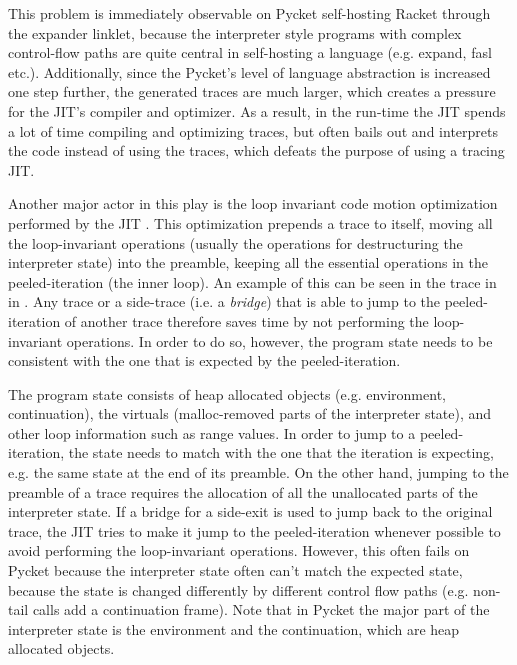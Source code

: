 This problem is immediately observable on Pycket self-hosting Racket
through the expander linklet, because the interpreter style programs
with complex control-flow paths are quite central in self-hosting a
language (e.g. expand, fasl etc.). Additionally, since the Pycket's
level of language abstraction is increased one step further, the
generated traces are much larger, which creates a pressure for the
JIT's compiler and optimizer. As a result, in the run-time the JIT
spends a lot of time compiling and optimizing traces, but often bails
out and interprets the code instead of using the traces, which defeats
the purpose of using a tracing JIT.


Another major actor in this play is the loop invariant code motion
optimization performed by the JIT \cite{loop-aware:12}. This
optimization prepends a trace to itself, moving all the loop-invariant
operations (usually the operations for destructuring the interpreter
state) into the preamble, keeping all the essential operations in the
peeled-iteration (the inner loop). An example of this can be seen in
the trace in  in . Any trace
or a side-trace (i.e. a \emph{bridge}) that is able to jump to the
peeled-iteration of another trace therefore saves time by not
performing the loop-invariant operations. In order to do so, however,
the program state needs to be consistent with the one that is expected
by the peeled-iteration.

The program state consists of heap allocated objects
(e.g. environment, continuation), the virtuals (malloc-removed parts
of the interpreter state), and other loop information such as range
values. In order to jump to a peeled-iteration, the state needs to
match with the one that the iteration is expecting, e.g. the same
state at the end of its preamble. On the other hand, jumping to the
preamble of a trace requires the allocation of all the unallocated
parts of the interpreter state. If a bridge for a side-exit is used to
jump back to the original trace, the JIT tries to make it jump to the
peeled-iteration whenever possible to avoid performing the
loop-invariant operations. However, this often fails on Pycket because
the interpreter state often can't match the expected state, because
the state is changed differently by different control flow paths
(e.g. non-tail calls add a continuation frame). Note that in Pycket
the major part of the interpreter state is the environment and the
continuation, which are heap allocated objects.

